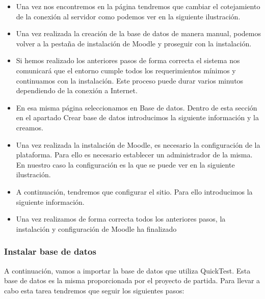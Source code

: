 \begin{itemize}
	\item Una vez nos encontremos en la página tendremos que cambiar el cotejamiento de la conexión al servidor como podemos ver en la siguiente ilustración.
	
	\item Una vez realizada la creación de la base de datos de manera manual, podemos volver a la pestaña de instalación de Moodle y proseguir con la instalación.

	\item Si hemos realizado los anteriores pasos de forma correcta el sistema nos comunicará que el entorno cumple todos los requerimientos mínimos y continuamos con la instalación. Este proceso puede durar varios minutos dependiendo de la conexión a Internet.
	
	\item En esa misma página seleccionamos en Base de datos. Dentro de esta sección en el apartado Crear base de datos introducimos la siguiente información y la creamos. 
	
	\item Una vez realizada la instalación de Moodle, es necesario la configuración de la plataforma. Para ello es necesario establecer un administrador de la misma. En nuestro caso la configuración es la que se puede ver en la siguiente ilustración. 
	
	\item A continuación, tendremos que configurar el sitio. Para ello introducimos la siguiente información. 
	
	\item Una vez realizamos de forma correcta todos los anteriores pasos, la instalación y configuración de Moodle ha finalizado

\end{itemize}

\subsubsection{Instalar base de datos}

A continuación, vamos a importar la base de datos que utiliza QuickTest. Esta base de datos es la misma proporcionada por el proyecto de partida. Para llevar a cabo esta tarea tendremos que seguir los siguientes pasos:

